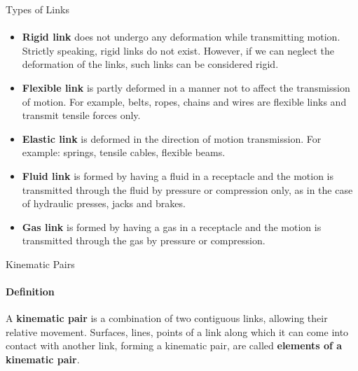 \documentclass[aspectratio=169]{beamer}
\begin{document}
\begin{frame}[t]{Types of Links}
\framesubtitle{}
\small
\vspace{-0.4cm}
\begin{itemize}
    \item \textbf{Rigid link} does not undergo any deformation while transmitting motion. Strictly speaking, rigid links do not exist. However, if we can neglect the deformation of the links, such links can be considered rigid.
    \item \textbf{Flexible link} is partly deformed in a manner not to affect the transmission of motion. For example, belts, ropes, chains and wires are flexible links and transmit tensile forces only.
    \item \textbf{Elastic link} is deformed in the direction of motion transmission. For example: springs, tensile cables, flexible beams.
    \item \textbf{Fluid link} is formed by having a fluid in a receptacle and the motion is transmitted through the fluid by pressure or compression only, as in the case of hydraulic presses, jacks and brakes.
    \item \textbf{Gas link} is formed by having a gas in a receptacle and the motion is transmitted through the gas by pressure or compression.
\end{itemize}
\end{frame}

\begin{frame}[t]{Kinematic Pairs}
\framesubtitle{Definition}
A \textbf{kinematic pair} is a combination of two contiguous links, allowing their relative movement. Surfaces, lines, points of a link along which it can come into contact with another link, forming a kinematic pair, are called \textbf{elements of a kinematic pair}.
\medskip
\end{frame}
\end{document}
